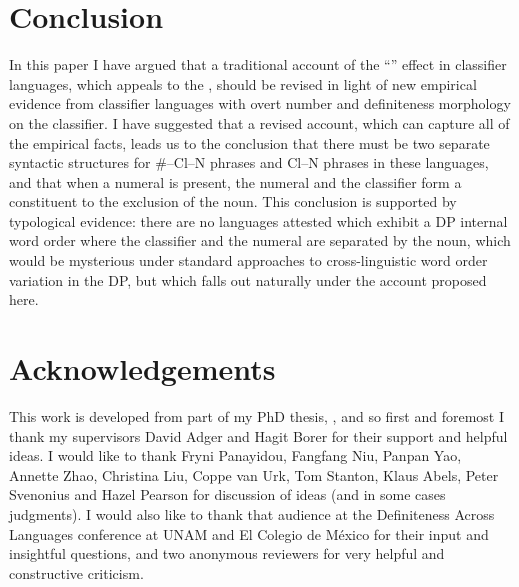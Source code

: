\documentclass[output=paper
,modfonts
,nonflat]{langsci/langscibook}
\begin{document}
\section{Conclusion}

In this paper I have argued that a traditional account of the ``'' effect in classifier languages, which appeals to the , should be revised in light of new empirical evidence from classifier languages with overt number and definiteness morphology on the classifier. I have suggested that a revised account, which can capture all of the empirical facts, leads us to the conclusion that there must be two separate syntactic structures for \#--Cl--N phrases and Cl--N phrases in these languages, and that when a numeral is present, the numeral and the classifier form a constituent to the exclusion of the noun. This conclusion is supported by typological evidence: there are no languages attested which exhibit a DP internal word order where the classifier and the numeral are separated by the noun, which would be mysterious under standard approaches to cross-linguistic word order variation in the DP, but which falls out naturally under the account proposed here.

\section*{Acknowledgements}
This work is developed from part of my PhD thesis, \citet{Hall2015}, and so first and foremost I thank my supervisors David Adger and Hagit Borer for their support and helpful ideas. I would like to thank Fryni Panayidou, Fangfang Niu, Panpan Yao, Annette Zhao, Christina Liu, Coppe van Urk, Tom Stanton, Klaus Abels, Peter Svenonius and Hazel Pearson for discussion of ideas (and in some cases judgments). I would also like to thank that audience at the Definiteness Across Languages conference at UNAM and El Colegio de México for their input and insightful questions, and two anonymous reviewers for very helpful and constructive criticism. \newpage
\end{document}
